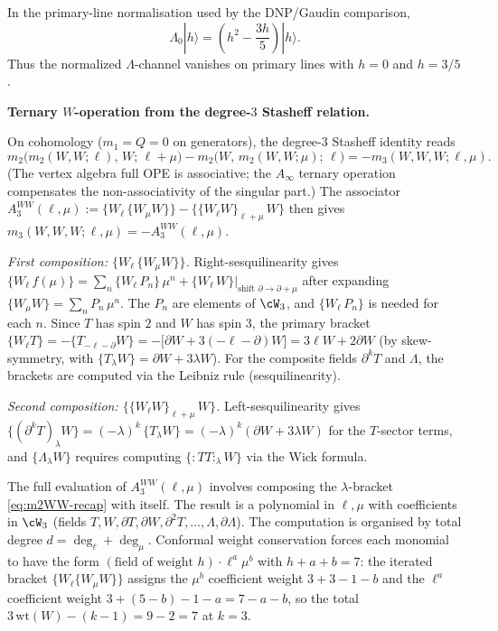 \medskip
\noindent
In the primary-line normalisation used by the DNP/Gaudin comparison,
\begin{equation}
\label{eq:w3-primary-lambda-eigenvalue}
	\Lambda_0|h\rangle
	=
	\left(h^2-\frac{3h}{5}\right)|h\rangle.
\end{equation}
Thus the normalized \(\Lambda\)-channel vanishes on primary lines
with \(h=0\) and \(h=3/5\).

\medskip
\noindent\textbf{Ternary \(W\)-operation from the degree-\(3\) Stasheff relation.}

\smallskip
On cohomology ($m_1 = Q = 0$ on generators), the degree-$3$ Stasheff
identity reads
\begin{equation}
\label{eq:w3-stasheff-3-WWW}
m_2\bigl(m_2(W,W;\ell),\, W;\, \ell+\mu\bigr)
- m_2\bigl(W,\, m_2(W,W;\mu);\, \ell\bigr)
= -m_3(W,W,W;\ell,\mu).
\end{equation}
(The vertex algebra full OPE is associative; the $A_\infty$ ternary
operation compensates the non-associativity of the singular part.)
The associator
$A_3^{WW}(\ell,\mu)
 := \{W_\ell\, \{W_\mu W\}\} - \{\{W_\ell W\}_{\ell+\mu}\, W\}$
then gives $m_3(W,W,W;\ell,\mu) = -A_3^{WW}(\ell,\mu)$.

\smallskip
\emph{First composition: $\{W_\ell\,\{W_\mu W\}\}$.}
Right-sesquilinearity gives
$\{W_\ell\, f(\mu)\} = \sum_n \{W_\ell\, P_n\}\,\mu^n
 + \{W_\ell\, W\}\bigl|_{\text{shift }\partial\to\partial+\mu}$
after expanding $\{W_\mu W\} = \sum_n P_n\,\mu^n$.
The $P_n$ are elements of $\cW_3$, and $\{W_\ell\, P_n\}$ is needed for each $n$. Since $T$ has spin $2$ and
$W$ has spin $3$, the primary bracket
$\{W_\ell T\} = -\{T_{-\ell-\partial} W\}
 = -\bigl[\partial W + 3(-\ell-\partial)W\bigr]
 = 3\ell W + 2\partial W$
(by skew-symmetry, with $\{T_\lambda W\} = \partial W + 3\lambda W$).
For the composite fields $\partial^k T$ and $\Lambda$, the brackets
are computed via the Leibniz rule (sesquilinearity).

\smallskip
\emph{Second composition:
$\{\{W_\ell W\}_{\ell+\mu}\, W\}$.}
Left-sesquilinearity gives
$\{(\partial^k T)_\lambda W\} = (-\lambda)^k\,\{T_\lambda W\}
= (-\lambda)^k(\partial W + 3\lambda W)$ for the $T$-sector terms,
and $\{\Lambda_\lambda W\}$ requires computing
$\{{:}TT{:}_\lambda W\}$ via the Wick formula.

\smallskip
The full evaluation of $A_3^{WW}(\ell,\mu)$ involves composing the
$\lambda$-bracket \eqref{eq:m2WW-recap} with itself.
The result is a polynomial in $\ell,\mu$ with coefficients in
$\cW_3$ (fields $T, W, \partial T, \partial W,
\partial^2 T, \ldots, \Lambda, \partial\Lambda$).
The computation is organised by total degree
$d = \deg_\ell + \deg_\mu$. Conformal weight conservation
forces each monomial to have the form
$(\text{field of weight } h) \cdot \ell^a \mu^b$ with
$h + a + b = 7$: the iterated bracket
$\{W_\ell\{W_\mu W\}\}$ assigns the $\mu^b$ coefficient weight
$3+3-1-b$ and the $\ell^a$ coefficient weight
$3 + (5-b) - 1 - a = 7 - a - b$, so the total
$3\,\mathrm{wt}(W) - (k-1) = 9 - 2 = 7$ at $k = 3$.

